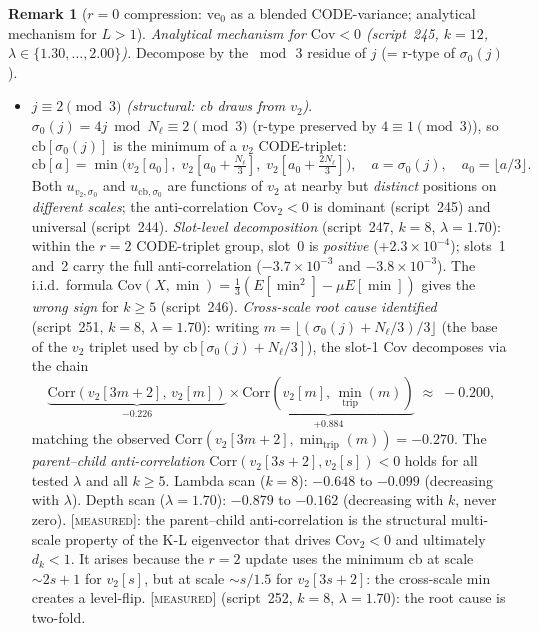 \documentclass[11pt]{article}
\theoremstyle{definition}
\newtheorem{remark}[theorem]{Remark}
\newcommand{\MEASURED}{\textup{[\textsc{measured}]}}
\begin{document}
\begin{remark}[$r{=}0$ compression: $\mathrm{ve}_0$ as a blended CODE-variance;
analytical mechanism for $L>1$]
\noindent\emph{Analytical mechanism for $\mathrm{Cov} < 0$ (script~245, $k{=}12$,
$\lambda\in\{1.30,\ldots,2.00\}$).}
Decompose by the $\bmod\,3$ residue of $j$ (= r-type of $\sigma_0(j)$).
\begin{itemize}
\item $j\equiv 2\pmod3$ \emph{(structural: cb draws from $v_2$)}.
  $\sigma_0(j)=4j\bmod N_\ell \equiv 2\pmod3$ (r-type preserved by $4\equiv1\pmod3$), so
  $\mathrm{cb}[\sigma_0(j)]$ is the minimum of a $v_2$ CODE-triplet:
  \[
    \mathrm{cb}[a] = \min\bigl(v_2[a_0],\;v_2[a_0+{\textstyle\tfrac{N_\ell}{3}}],\;
    v_2[a_0{+}\tfrac{2N_\ell}{3}]\bigr), \quad
    a = \sigma_0(j),\quad a_0 = \bigl\lfloor a/3\bigr\rfloor.
  \]
  Both $u_{v_2,\sigma_0}$ and $u_{\mathrm{cb},\sigma_0}$ are functions of
  $v_2$ at nearby but \emph{distinct} positions on \emph{different scales};
  the anti-correlation $\mathrm{Cov}_2 < 0$ is dominant (script~245) and
  universal (script~244).
  \emph{Slot-level decomposition} (script~247, $k{=}8$, $\lambda{=}1.70$):
  within the $r{=}2$ CODE-triplet group, slot~0 is \emph{positive}
  ($+2.3{\times}10^{-4}$); slots~1 and~2 carry the full anti-correlation
  ($-3.7{\times}10^{-3}$ and $-3.8{\times}10^{-3}$).
  The i.i.d.\ formula $\mathrm{Cov}(X,\min)=\tfrac13(E[\min^2]-\mu E[\min])$
  gives the \emph{wrong sign} for $k{\ge}5$ (script~246).
  \emph{Cross-scale root cause identified} (script~251, $k{=}8$,
  $\lambda{=}1.70$): writing $m = \lfloor(\sigma_0(j){+}N_\ell/3)/3\rfloor$
  (the base of the $v_2$ triplet used by $\mathrm{cb}[\sigma_0(j){+}N_\ell/3]$),
  the slot-1 Cov decomposes via the chain
  \[
  \underbrace{\mathrm{Corr}(v_2[3m{+}2],\, v_2[m])}_{-0.226} \times
  \underbrace{\mathrm{Corr}(v_2[m],\, \min_{\mathrm{trip}}(m))}_{+0.884}
  \;\approx\; -0.200,
  \]
  matching the observed $\mathrm{Corr}(v_2[3m{+}2],\min_{\mathrm{trip}}(m)) = -0.270$.
  The \emph{parent--child anti-correlation} $\mathrm{Corr}(v_2[3s{+}2], v_2[s]) < 0$
  holds for all tested $\lambda$ and all $k\ge5$.
  Lambda scan ($k{=}8$): $-0.648$ to $-0.099$ (decreasing with $\lambda$).
  Depth scan ($\lambda{=}1.70$): $-0.879$ to $-0.162$ (decreasing with $k$, never zero).
  \MEASURED{}: the parent--child anti-correlation is the structural
  multi-scale property of the K-L eigenvector that drives $\mathrm{Cov}_2 < 0$
  and ultimately $d_k < 1$.  It arises because the $r{=}2$ update uses the
  minimum cb at scale $\sim 2s{+}1$ for $v_2[s]$, but at scale $\sim s/1.5$
  for $v_2[3s{+}2]$: the cross-scale min creates a level-flip.
  \MEASURED{} (script~252, $k{=}8$, $\lambda{=}1.70$): the root cause is two-fold.

\end{itemize}
\end{remark}
\end{document}
